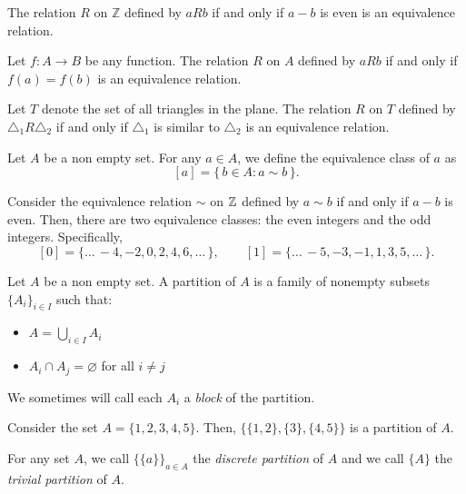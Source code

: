 \begin{example}
  The relation \(R\) on \(\mathbb{Z}\) defined by \(aRb\) if and only if \(a-b\) is even is an equivalence relation.
\end{example}

\begin{example}
  Let $f:A\to B$ be any function.  The relation \(R\) on \(A\) defined by \(aRb\) if and only if \(f(a)=f(b)\) is an equivalence relation.
\end{example}

\begin{example}
  Let $T$ denote the set of all triangles in the plane.  The relation \(R\) on \(T\) defined by \(\triangle_1 R \triangle_2\) if and only if \(\triangle_1\) is similar to \(\triangle_2\) is an equivalence relation.
\end{example}

\begin{definition}
  Let $A$ be a non empty set. For any $a\in A$, we define the equivalence class of $a$ as
  \[
    [a] = \{\,b\in A: a\sim b\,\}.
  \]
\end{definition}

\begin{example}
  Consider the equivalence relation $\sim$ on $\mathbb{Z}$ defined by $a\sim b$ if and only if $a-b$ is even. Then, there are two equivalence classes: the even integers and the odd integers. Specifically,
  \[
    [0] = \{\ldots\,-4,-2, 0, 2, 4, 6, \ldots\,\},\qquad [1] = \{\ldots\,-5,-3, -1, 1, 3, 5, \ldots\,\}.
  \]
\end{example}

\begin{definition}
  Let $A$ be a non empty set. A partition of $A$ is a family of nonempty subsets \(\{A_i\}_{i\in I}\) such that:
  \begin{itemize}
    \item \(A = \bigcup_{i\in I} A_i\)
    \item \(A_i \cap A_j = \varnothing\) for all \(i \neq j\)
  \end{itemize}
  We sometimes will call each \(A_i\) a \emph{block} of the partition.
\end{definition}

\begin{example}
  Consider the set \(A = \{1, 2, 3, 4, 5\}\). Then, \(\{\{1, 2\}, \{3\}, \{4, 5\}\}\) is a partition of \(A\).
\end{example}

\begin{example}
  For any set $A$, we call $\{\{a\}\}_{a\in A}$ the \emph{discrete partition} of $A$ and we call $\{A\}$ the \emph{trivial partition} of $A$.
\end{example}

